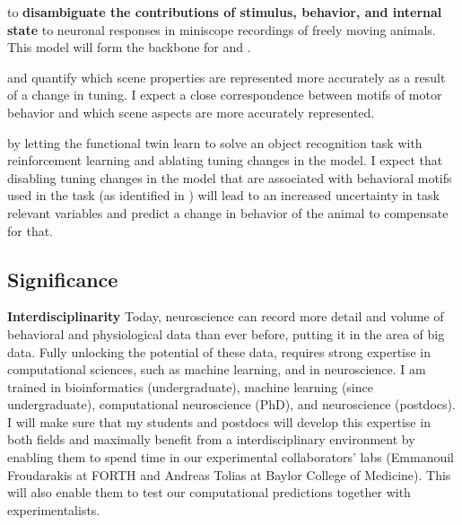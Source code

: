 \documentclass[B2,COG]{ercgrant}
\begin{document}
 \textbf{\oonetitle} to \textbf{disambiguate the contributions of stimulus, behavior, and internal state} to neuronal responses in miniscope recordings of freely moving animals. This model will form the backbone for  and .

 \textbf{\otwotitle} and quantify which scene properties are represented more accurately as a result of a change in tuning. 
I expect a close correspondence between motifs of motor behavior and which scene aspects are more accurately represented. 

 \textbf{\othreetitle} by letting the functional twin learn to solve an object recognition task with reinforcement learning and ablating tuning changes in the model. 
I expect that disabling tuning changes in the model that are associated with behavioral motifs used in the task (as identified in ) will lead to an increased uncertainty in task relevant variables and predict a change in behavior of the animal to compensate for that. 

\subsection{Significance}

\textbf{Interdisciplinarity} 
Today, neuroscience can record more detail and volume  of  behavioral and physiological data than ever before, putting it in the area of big data. 
Fully unlocking the potential of these data, requires strong expertise in computational sciences, such as  machine learning, and in neuroscience. 
I am trained in bioinformatics (undergraduate), machine learning (since undergraduate), computational neuroscience (PhD), and neuroscience (postdocs).
I will make sure that my students and postdocs will develop this expertise in both fields and maximally benefit from a interdisciplinary environment by enabling them to spend time in our experimental collaborators’ labs (Emmanouil Froudarakis at FORTH and Andreas Tolias at Baylor College of Medicine).
This will also enable them to test our computational predictions together with experimentalists.
\end{document}
